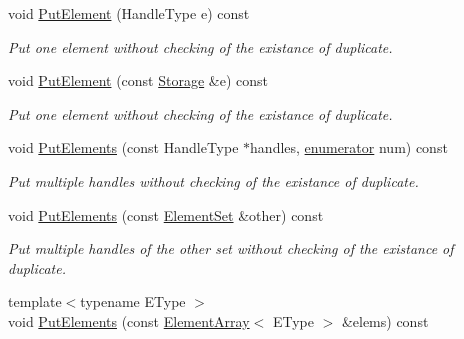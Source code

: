 \begin{DoxyCompactItemize}
\item 
void \hyperlink{classINMOST_1_1ElementSet_a13a74a11c9b6ece25ed448bf5cb7c866}{Put\-Element} (Handle\-Type e) const 
\begin{DoxyCompactList}\small\item\em Put one element without checking of the existance of duplicate. \end{DoxyCompactList}\item 
void \hyperlink{classINMOST_1_1ElementSet_af35d9f82faa96fba32e0a4022ffe38fe}{Put\-Element} (const \hyperlink{classINMOST_1_1Storage}{Storage} \&e) const 
\begin{DoxyCompactList}\small\item\em Put one element without checking of the existance of duplicate. \end{DoxyCompactList}\item 
\hypertarget{classINMOST_1_1ElementSet_af4ef11220e0080aa1c63756af45addf9}{void \hyperlink{classINMOST_1_1ElementSet_af4ef11220e0080aa1c63756af45addf9}{Put\-Elements} (const Handle\-Type $\ast$handles, \hyperlink{classINMOST_1_1Storage_ae333dfced6fa9cfde0c8e7dcf1b0cc2b}{enumerator} num) const }\label{classINMOST_1_1ElementSet_af4ef11220e0080aa1c63756af45addf9}

\begin{DoxyCompactList}\small\item\em Put multiple handles without checking of the existance of duplicate. \end{DoxyCompactList}\item 
\hypertarget{classINMOST_1_1ElementSet_a6d09e6ad48a8746c01b0dfccb21441ae}{void \hyperlink{classINMOST_1_1ElementSet_a6d09e6ad48a8746c01b0dfccb21441ae}{Put\-Elements} (const \hyperlink{classINMOST_1_1ElementSet}{Element\-Set} \&other) const }\label{classINMOST_1_1ElementSet_a6d09e6ad48a8746c01b0dfccb21441ae}

\begin{DoxyCompactList}\small\item\em Put multiple handles of the other set without checking of the existance of duplicate. \end{DoxyCompactList}\item 
\hypertarget{classINMOST_1_1ElementSet_a2b27cedaf22cb5e20e36bcb480c9e50c}{{\footnotesize template$<$typename E\-Type $>$ }\\void \hyperlink{classINMOST_1_1ElementSet_a2b27cedaf22cb5e20e36bcb480c9e50c}{Put\-Elements} (const \hyperlink{classINMOST_1_1ElementArray}{Element\-Array}$<$ E\-Type $>$ \&elems) const }\label{classINMOST_1_1ElementSet_a2b27cedaf22cb5e20e36bcb480c9e50c}


\end{DoxyCompactItemize}
